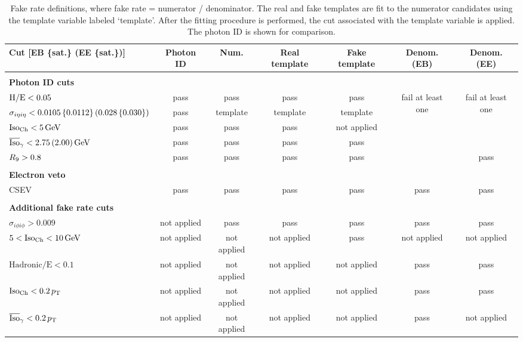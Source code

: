 \begin{table}[!htbp]
\caption{Fake rate definitions, where fake rate = numerator / denominator. The real and fake templates are fit to the numerator candidates using the template variable labeled `template'.
 After the fitting procedure is performed, the cut associated with the template variable is applied. The photon ID is shown for comparison.}
\label{tab:fake_rate_cuts}

  \centering
  \vspace{\baselineskip}
  \tiny
  \begin{tabular}{l|cccccc}
  \hline \hline
  Cut [EB \{sat.\} (EE \{sat.\})] & Photon ID & Num. & Real template & Fake template & Denom. (EB) & Denom. (EE) \\
  \hline
   & & & & & & \\
  \textbf{Photon ID cuts} & & & & & & \\
  \hline
  $\mathrm{H/E} < 0.05$ & pass & pass & pass & pass & \multirow{5}{*}{fail at least one} &  \multirow{4}{*}{fail at least one} \\
  $\sigma_{i\eta i\eta} < 0.0105\, \{0.0112\}\, (0.028\, \{0.030\})$ & pass & template & template & template & & \\
  $\text{Iso}_{\text{Ch}} < 5\,\text{Ge\hspace{-.08em}V}$ & pass & pass & pass & not applied & & \\
  $\overline{\mbox{Iso}}_\gamma < 2.75\, (2.00)\,\text{Ge\hspace{-.08em}V}$ & pass & pass & pass & pass & & pass \\
  $R_{9} > 0.8$ & pass & pass & pass & pass & pass & pass \\
   & & & & & & \\
  \textbf{Electron veto} & & & & & & \\
  \hline
  CSEV & pass & pass & pass & pass & pass & pass \\
   & & & & & & \\
  \textbf{Additional fake rate cuts} & & & & & & \\
  \hline
  $\sigma_{i\phi i\phi} > 0.009$ & not applied & pass & pass & pass & pass & pass \\
  $5 < \text{Iso}_{\text{Ch}} < 10\,\text{Ge\hspace{-.08em}V}$ & not applied & not applied & not applied & pass & not applied & not applied \\
  $\text{Hadronic/E} < 0.1$ & not applied & not applied & not applied & not applied & pass & pass \\
  $\text{Iso}_{\text{Ch}} < 0.2\,p_{\mathrm{T}}$ & not applied & not applied & not applied & not applied & pass & pass \\
  $\overline{\mbox{Iso}}_\gamma < 0.2\,p_{\mathrm{T}}$ & not applied & not applied & not applied & not applied & pass & not applied \\
  \hline \hline
  \end{tabular}
\end{table}

